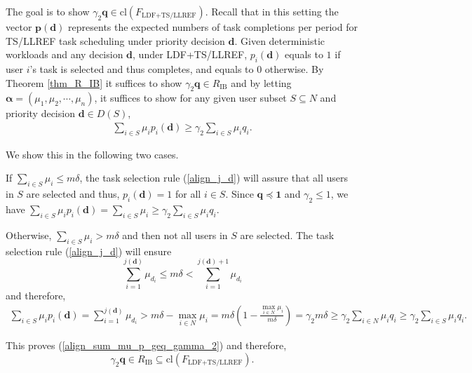 \documentclass[prodmode,acmtompecs]{acmsmall}
\newcommand{\reqvec}{\mathbf{q}}
\newcommand{\reqscalar}{q}
\newcommand{\ribvec}{\boldsymbol{\alpha}}
\newcommand{\fullUserSet}{N}
\newcommand{\myComments}[1]{}
\newif\iftompecsextended
\newcommand{\tompecsextendedStart}{\iftompecsextended  \myComments{TOMPECS extended version: }}
\begin{document}
The goal is to show $\gamma_2 \reqvec \in \text{cl}(F_{\text{LDF+TS/LLREF}})$. Recall that in this setting the vector $\mathbf{p}(\mathbf{d})$ represents the expected numbers of task completions per period for TS/LLREF task scheduling under priority decision $\mathbf{d}$. Given deterministic workloads and any decision $\mathbf{d}$, under LDF+TS/LLREF, $p_i(\mathbf{d})$ equals to $1$ if user $i$'s task is selected and thus completes, and equals to $0$ otherwise. By Theorem \ref{thm_R_IB} it suffices to show $\gamma_2 \reqvec \in R_{\text{IB}}$ and by letting $\ribvec = (\mu_1, \mu_2, \cdots, \mu_n)$, it suffices to show for any given user subset $S\subseteq \fullUserSet$ and priority decision $\mathbf{d} \in D(S)$, 
\begin{align}
\label{align_sum_mu_p_geq_gamma_2}
\sum\limits_{i\in S} \mu_i p_i(\mathbf{d}) \geq \gamma_2 \sum\limits_{i\in S} \mu_i \reqscalar_i. 
\end{align}

We show this in the following two cases. 

If $\sum\limits_{i\in S} \mu_i \leq m\delta$, the task selection rule (\ref{align_j_d}) will assure that all users in $S$ are selected and thus, $p_i(\mathbf{d}) = 1$ for all $i\in S$. Since $\reqvec \preceq \mathbf{1}$ and $\gamma_2 \leq 1$, we have 
$\sum\limits_{i\in S} \mu_i p_i(\mathbf{d}) = \sum\limits_{i\in S} \mu_i \geq \gamma_2 \sum\limits_{i\in S} \mu_i \reqscalar_i$. 

Otherwise, $\sum\limits_{i\in S} \mu_i > m\delta$ and then not all users in $S$ are selected. 
The task selection rule (\ref{align_j_d}) will ensure 
$$
\sum\limits_{i = 1}^{j(\mathbf{d})} \mu_{d_i} \leq m\delta < \sum\limits_{i = 1}^{j(\mathbf{d}) + 1} \mu_{d_i}
$$ and therefore, 
\begin{align*}
\sum\limits_{i\in S} \mu_i p_i(\mathbf{d}) = \sum\limits_{i = 1}^{j(\mathbf{d})} \mu_{d_i} > m\delta - \max\limits_{i\in \fullUserSet} \mu_i = m\delta (1 - \frac{\max\limits_{i\in \fullUserSet} \mu_i}{m\delta}) = \gamma_2 m\delta \geq \gamma_2 \sum\limits_{i\in \fullUserSet} \mu_i \reqscalar_i \geq \gamma_2 \sum\limits_{i\in S} \mu_i \reqscalar_i. 
\end{align*}

This proves (\ref{align_sum_mu_p_geq_gamma_2}) and therefore, 
$$
\gamma_2 \reqvec \in R_{\text{IB}} \subseteq \text{cl}(F_{\text{LDF+TS/LLREF}}). 
$$

\tompecsextendedStart
\end{document}
